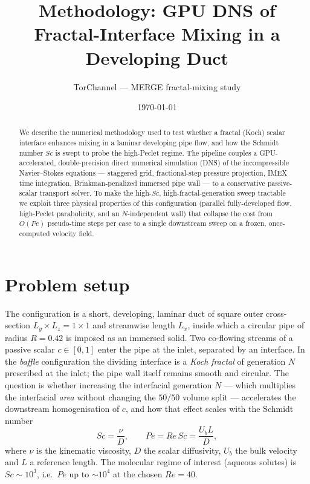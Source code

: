 \documentclass[11pt]{article}
\title{Methodology: GPU DNS of Fractal-Interface Mixing in a Developing Duct}
\author{TorChannel --- MERGE fractal-mixing study}
\date{\today}
\newcommand{\Sc}{\mathit{Sc}}
\newcommand{\Pe}{\mathit{Pe}}
\newcommand{\Renum}{\mathit{Re}}
\begin{document}
\maketitle

\begin{abstract}
We describe the numerical methodology used to test whether a fractal
(Koch) scalar interface enhances mixing in a laminar developing pipe
flow, and how the Schmidt number $\Sc$ is swept to probe the
high-Peclet regime. The pipeline couples a GPU-accelerated, double-precision
direct numerical simulation (DNS) of the incompressible Navier--Stokes
equations --- staggered grid, fractional-step pressure projection, IMEX
time integration, Brinkman-penalized immersed pipe wall --- to a
conservative passive-scalar transport solver. To make the high-$\Sc$,
high-fractal-generation sweep tractable we exploit three physical
properties of this configuration (parallel fully-developed flow,
high-Peclet parabolicity, and an $N$-independent wall) that collapse the
cost from $O(\Pe)$ pseudo-time steps per case to a single downstream
sweep on a frozen, once-computed velocity field.
\end{abstract}

\section{Problem setup}

The configuration is a short, developing, laminar duct of square outer
cross-section $L_y \times L_z = 1 \times 1$ and streamwise length $L_x$,
inside which a circular pipe of radius $R = 0.42$ is imposed as an
immersed solid. Two co-flowing streams of a passive scalar
$c \in [0,1]$ enter the pipe at the inlet, separated by an interface.
In the \emph{baffle} configuration the dividing interface is a
\emph{Koch fractal} of generation $N$ prescribed at the inlet; the pipe
wall itself remains smooth and circular. The question is whether
increasing the interfacial generation $N$ --- which multiplies the
interfacial \emph{area} without changing the $50/50$ volume split ---
accelerates the downstream homogenisation of $c$, and how that effect
scales with the Schmidt number
\begin{equation}
  \Sc = \frac{\nu}{D}, \qquad
  \Pe = \Renum\,\Sc = \frac{U_b L}{D},
\end{equation}
where $\nu$ is the kinematic viscosity, $D$ the scalar diffusivity,
$U_b$ the bulk velocity and $L$ a reference length. The molecular
regime of interest (aqueous solutes) is $\Sc \sim 10^3$, i.e.\
$\Pe$ up to $\sim 10^4$ at the chosen $\Renum = 40$.
\end{document}
